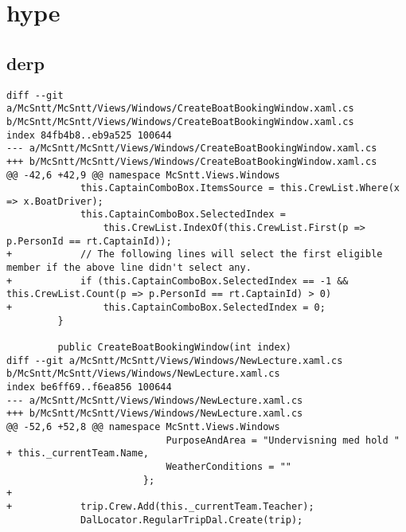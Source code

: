 \documentclass[a4paper,11pt,fleqn,twoside,openright,final]{memoir}
\begin{document}
\sloppy


\chapter{hype}
\section{derp}
\begin{lstlisting}[frame=single, caption=Forsidens Code-Behind, label=fntpg-cb]
diff --git a/McSntt/McSntt/Views/Windows/CreateBoatBookingWindow.xaml.cs b/McSntt/McSntt/Views/Windows/CreateBoatBookingWindow.xaml.cs
index 84fb4b8..eb9a525 100644
--- a/McSntt/McSntt/Views/Windows/CreateBoatBookingWindow.xaml.cs
+++ b/McSntt/McSntt/Views/Windows/CreateBoatBookingWindow.xaml.cs
@@ -42,6 +42,9 @@ namespace McSntt.Views.Windows
             this.CaptainComboBox.ItemsSource = this.CrewList.Where(x => x.BoatDriver);
             this.CaptainComboBox.SelectedIndex =
                 this.CrewList.IndexOf(this.CrewList.First(p => p.PersonId == rt.CaptainId));
+            // The following lines will select the first eligible member if the above line didn't select any.
+            if (this.CaptainComboBox.SelectedIndex == -1 && this.CrewList.Count(p => p.PersonId == rt.CaptainId) > 0) 
+                this.CaptainComboBox.SelectedIndex = 0;
         }
 
         public CreateBoatBookingWindow(int index)
diff --git a/McSntt/McSntt/Views/Windows/NewLecture.xaml.cs b/McSntt/McSntt/Views/Windows/NewLecture.xaml.cs
index be6ff69..f6ea856 100644
--- a/McSntt/McSntt/Views/Windows/NewLecture.xaml.cs
+++ b/McSntt/McSntt/Views/Windows/NewLecture.xaml.cs
@@ -52,6 +52,8 @@ namespace McSntt.Views.Windows
                            PurposeAndArea = "Undervisning med hold " + this._currentTeam.Name,
                            WeatherConditions = ""
                        };
+
+            trip.Crew.Add(this._currentTeam.Teacher);
             DalLocator.RegularTripDal.Create(trip);
\end{lstlisting}
\end{document}
